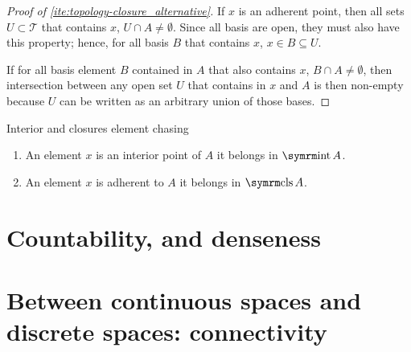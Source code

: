 \begin{proof}[Proof of \cref{ite:topology-closure_alternative}]
  \forwarddir If \(x\) is an adherent point, then all sets \(U \subset \mathcal{T}\)
  that contains \(x\), \(U \cap A \neq \emptyset\). Since all basis are open, they must
  also have this property; hence, for all basis \(B\) that contains \(x\), \(x \in B \subseteq U\).

  \backwarddir If for all basis element \(B\) contained in \(A\) that also contains \(x\),
  \(B \cap A \neq \emptyset\), then intersection between any open set \(U\) that contains in \(x\)
  and \(A\) is then non-empty because \(U\) can be written as an arbitrary union of those bases.
\end{proof}

\begin{lemma}{Interior and closures element chasing}{}
  \begin{enumerate}
    \item An element \(x\) is an interior point of \(A\) \ifft it belongs in \(\intr A\).
    \item An element \(x\) is adherent to \(A\) \ifft it belongs in \(\clos A\).
  \end{enumerate}
\end{lemma}

\section{Countability, and denseness}

\section{Between continuous spaces and discrete spaces: connectivity}
